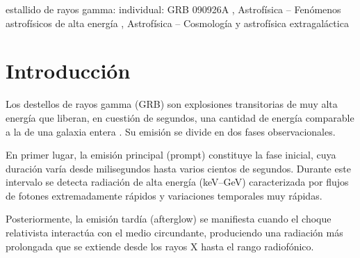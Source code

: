 \documentclass[final,5p,times,twocolumn,authoryear]{elsarticle}
\begin{document}
\begin{frontmatter}


\begin{keyword}
estallido de rayos gamma: individual: GRB 090926A \sep
Astrofísica – Fenómenos astrofísicos de alta energía \sep
Astrofísica – Cosmología y astrofísica extragaláctica





\end{keyword}


\end{frontmatter}




\section{Introducción}
\label{introduction}

Los destellos de rayos gamma (GRB) son explosiones transitorias de muy alta energía que liberan, en cuestión de segundos, una cantidad de energía comparable a la de una galaxia entera \citep{carroll2017}.  Su emisión se divide en dos fases observacionales.

En primer lugar, la emisión principal (prompt) constituye la fase inicial, cuya duración varía desde milisegundos hasta varios cientos de segundos.  Durante este intervalo se detecta radiación de alta energía (keV–GeV) caracterizada por flujos de fotones extremadamente rápidos y variaciones temporales muy rápidas.

Posteriormente, la emisión tardía (afterglow) se manifiesta cuando el choque relativista interactúa con el medio circundante, produciendo una radiación más prolongada que se extiende desde los rayos X hasta el rango radiofónico.
\end{document}
